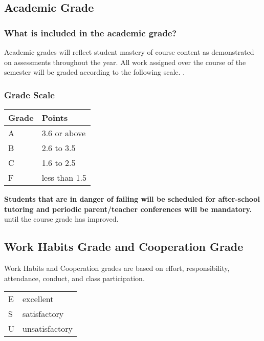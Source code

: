 \documentclass[11pt]{article}
\begin{document}
\subsection{Academic Grade}
\label{sec:org1eb68d0}
\subsubsection{What is included in the academic grade?}
\label{sec:org5c1a26c}
Academic grades will reflect student mastery of course content as demonstrated on assessments throughout the year. All work assigned over the course of the semester will be graded according to the following scale.
. 
\subsubsection{Grade Scale}
\label{sec:org948a890}

\begin{center}
\begin{tabular}{ll}
\hline
Grade & Points\\[0pt]
\hline
A & 3.6 or above\\[0pt]
\hline
B & 2.6 to 3.5\\[0pt]
\hline
C & 1.6 to 2.5\\[0pt]
\hline
F & less than 1.5\\[0pt]
\hline
\end{tabular}
\end{center}

\textbf{\textbf{Students that are in danger of failing will be scheduled for after-school tutoring and periodic parent/teacher conferences will be mandatory.}} until the course grade has improved.

\subsection{Work Habits Grade and Cooperation Grade}
\label{sec:org37851c3}

Work Habits and Cooperation grades are based on effort, responsibility, attendance, conduct, and class participation. 
\begin{center}
\begin{tabular}{ll}
\hline
E & excellent\\[0pt]
S & satisfactory\\[0pt]
U & unsatisfactory\\[0pt]
\hline
\end{tabular}
\end{center}
\end{document}
